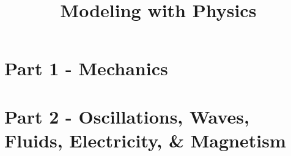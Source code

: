 \documentclass[9pt,arxiv,red]{lapreprint}
\title{Modeling with Physics}
\begin{document}
\maketitle


\section{Part 1 - Mechanics}























\section{Part 2 - Oscillations, Waves, Fluids, Electricity, \& Magnetism}
























\end{document}

